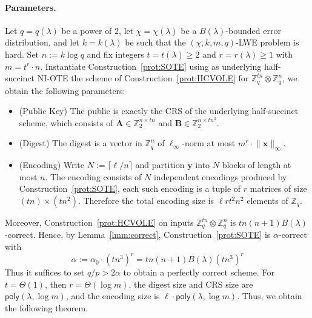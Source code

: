 \documentclass{theoretics}
\newcommand{\poly}{\mathsf{poly}}
\begin{document}
{\paragraph{Parameters.} Let $q=q(\lambda)$ be a power of $2$, let $\chi=\chi(\lambda)$ be a
$B(\lambda)$-bounded error distribution, and let $k=k(\lambda)$ be such that
the $(\chi,k,m,q)$-LWE problem is hard. Set $n := k \log q $ and fix integers $t=t(\lambda)\ge 2$ and $r=r(\lambda)\ge 1$ with $m = t^r \cdot n$. Instantiate Construction~\ref{prot:SOTE} using as underlying
half-succinct NI-OTE the scheme of Construction~\ref{prot:HCVOLE}
for $\mathbb Z_q^{t n} \otimes \mathbb Z_q^{n}$, we obtain the following parameters:
\begin{itemize}
    \item (Public Key) The public is exactly the CRS of the underlying half-succinct scheme, which consists of $\mathbf{A} \in \mathbb Z_2^{n\times t n}$ and $\mathbf{B} \in \mathbb Z_2^{n\times t n^3}$.
    \item (Digest) The digest is a vector in $\mathbb Z_q^{n}$ of $\ell_\infty$-norm at most $m^{r}\cdot \lVert\mathbf{x}\rVert_\infty$.
    \item (Encoding) Write $N := \lceil \ell/n \rceil$ and partition $\mathbf y$ into $N$ blocks of length at most $n$. The encoding consists of $N$ independent encodings
    produced by Construction~\ref{prot:SOTE}, each such encoding
    is a tuple of $r$ matrices of size $(t n)\times (t n^2)$. Therefore the
    total encoding size is
    $\ell  r  t^2 n^2$
     elements of $\mathbb Z_q$.
\end{itemize}
Moreover, Construction~\ref{prot:HCVOLE} on inputs
    $\mathbb Z_q^{t n} \otimes \mathbb Z_q^n$ is $t n (n+1) B(\lambda)$-correct. Hence, by Lemma~\ref{lmm:correct}, 
    Construction~\ref{prot:SOTE} is
    $\alpha$-correct with
    \[
    \alpha:=\alpha_0 \cdot (t n^3)^r
    = t n (n+1) B(\lambda) (t n^3)^r
    \]
    Thus it suffices to set $q/p > 2\alpha$ to obtain a perfectly correct scheme. 
For $t=\Theta(1)$, then $r=\Theta(\log m)$, the digest size and CRS size are
$\poly(\lambda,\log m)$, and the encoding size is
    $\ell \cdot \poly(\lambda,\log m)$. Thus, we obtain the following theorem.}
\end{document}
